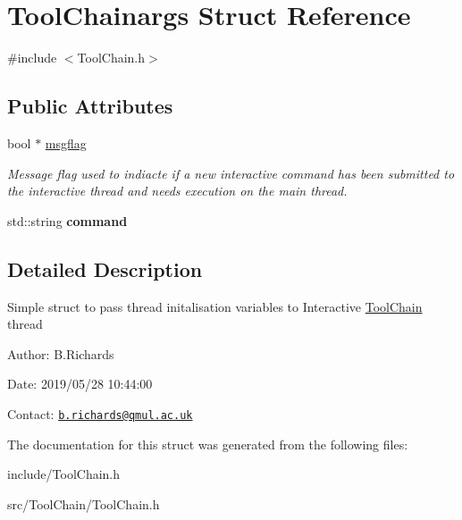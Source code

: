\hypertarget{structToolChainargs}{\section{Tool\-Chainargs Struct Reference}
\label{structToolChainargs}
}


{\ttfamily \#include $<$Tool\-Chain.\-h$>$}

\subsection*{Public Attributes}
\begin{DoxyCompactItemize}
\item 
\hypertarget{structToolChainargs_a12b7600b4c7a0362703a1d75d6090ee5}{bool $\ast$ \hyperlink{structToolChainargs_a12b7600b4c7a0362703a1d75d6090ee5}{msgflag}}\label{structToolChainargs_a12b7600b4c7a0362703a1d75d6090ee5}

\begin{DoxyCompactList}\small\item\em Message flag used to indiacte if a new interactive command has been submitted to the interactive thread and needs execution on the main thread. \end{DoxyCompactList}\item 
\hypertarget{structToolChainargs_a9d4c78b8b89eba4b7e8af9e6278c1bfd}{std\-::string {\bfseries command}}\label{structToolChainargs_a9d4c78b8b89eba4b7e8af9e6278c1bfd}

\end{DoxyCompactItemize}


\subsection{Detailed Description}
Simple struct to pass thread initalisation variables to Interactive \hyperlink{classToolChain}{Tool\-Chain} thread

\begin{DoxyParagraph}{Author\-:}
B.\-Richards 
\end{DoxyParagraph}
\begin{DoxyParagraph}{Date\-:}
2019/05/28 10\-:44\-:00 
\end{DoxyParagraph}
Contact\-: \href{mailto:b.richards@qmul.ac.uk}{\tt b.\-richards@qmul.\-ac.\-uk} 

The documentation for this struct was generated from the following files\-:\begin{DoxyCompactItemize}
\item 
include/Tool\-Chain.\-h\item 
src/\-Tool\-Chain/Tool\-Chain.\-h\end{DoxyCompactItemize}
